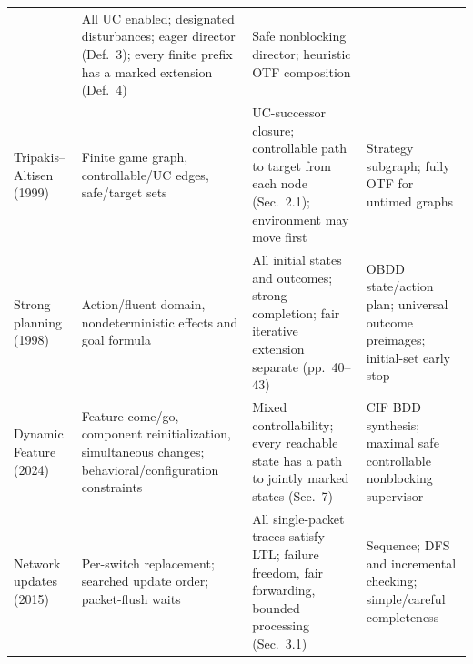 \documentclass[11pt]{article}
\begin{document}
\begin{table}[!htbp]
\begin{tabular}{@{}>{\raggedright\arraybackslash}p{.15\linewidth}>{\raggedright\arraybackslash}p{.28\linewidth}>{\raggedright\arraybackslash}p{.29\linewidth}>{\raggedright\arraybackslash}p{.23\linewidth}@{}}
& All UC enabled; designated disturbances; eager director (Def.~3); every finite prefix has a marked extension (Def.~4)
& Safe nonblocking director; heuristic OTF composition\\
Tripakis--Altisen (1999)
& Finite game graph, controllable/UC edges, safe/target sets
& UC-successor closure; controllable path to target from each node (Sec.~2.1); environment may move first
& Strategy subgraph; fully OTF for untimed graphs\\
Strong planning (1998)
& Action/fluent domain, nondeterministic effects and goal formula
& All initial states and outcomes; strong completion; fair iterative extension separate (pp.~40--43)
& OBDD state/action plan; universal outcome preimages; initial-set early stop\\
Dynamic Feature (2024)
& Feature come/go, component reinitialization, simultaneous changes; behavioral/configuration constraints
& Mixed controllability; every reachable state has a path to jointly marked states (Sec.~7)
& CIF BDD synthesis; maximal safe controllable nonblocking supervisor\\
Network updates (2015)
& Per-switch replacement; searched update order; packet-flush waits
& All single-packet traces satisfy LTL; failure freedom, fair forwarding, bounded processing (Sec.~3.1)
& Sequence; DFS and incremental checking; simple/careful completeness\\
\bottomrule
\end{tabular}
\end{table}
\end{document}
